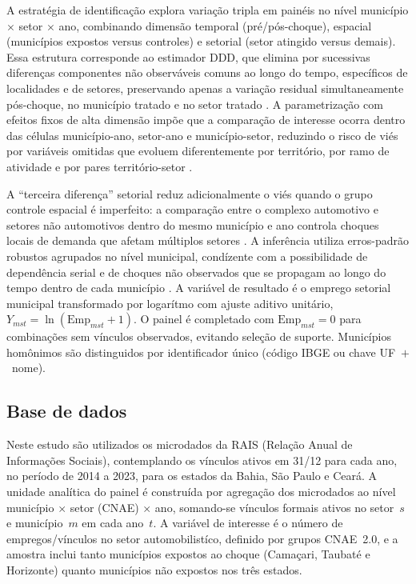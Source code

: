 \documentclass[12pt,a4paper]{article}
\begin{document}
A estrat\'egia de identifica\c{c}\~ao explora varia\c{c}\~ao tripla em pain\'eis no n\'ivel munic\'ipio $\times$ setor $\times$ ano, combinando dimens\~ao temporal (pr\'e/p\'os-choque), espacial (munic\'ipios expostos versus controles) e setorial (setor atingido versus demais). Essa estrutura corresponde ao estimador DDD, que elimina por sucessivas diferen\c{c}as componentes n\~ao observ\'aveis comuns ao longo do tempo, espec\'ificos de localidades e de setores, preservando apenas a varia\c{c}\~ao residual simultaneamente p\'os-choque, no munic\'ipio tratado e no setor tratado \parencite{olden2022}. A parametriza\c{c}\~ao com efeitos fixos de alta dimens\~ao imp\~oe que a compara\c{c}\~ao de interesse ocorra dentro das c\'elulas munic\'ipio-ano, setor-ano e munic\'ipio-setor, reduzindo o risco de vi\'es por vari\'aveis omitidas que evoluem diferentemente por territ\'orio, por ramo de atividade e por pares territ\'orio-setor \parencite{wooldridge2010}.

A ``terceira diferen\c{c}a'' setorial reduz adicionalmente o vi\'es quando o grupo controle espacial \'e imperfeito: a compara\c{c}\~ao entre o complexo automotivo e setores n\~ao automotivos dentro do mesmo munic\'ipio e ano controla choques locais de demanda que afetam m\'ultiplos setores \parencite{berck2016}. A infer\^encia utiliza erros-padr\~ao robustos agrupados no n\'ivel municipal, cond\'izente com a possibilidade de depend\^encia serial e de choques n\~ao observados que se propagam ao longo do tempo dentro de cada munic\'ipio \parencite{bertrand2004,cameron2015}. A vari\'avel de resultado \'e o emprego setorial municipal transformado por logar\'itmo com ajuste aditivo unit\'ario, $Y_{mst} = \ln(\text{Emp}_{mst}+1)$. O painel \'e completado com $\text{Emp}_{mst} = 0$ para combina\c{c}\~oes sem v\'inculos observados, evitando sele\c{c}\~ao de suporte. Munic\'ipios hom\^onimos s\~ao distinguidos por identificador \'unico (c\'odigo IBGE ou chave UF~$+$~nome).

\subsection{Base de dados}
\label{sub:dados}

Neste estudo s\~ao utilizados os microdados da RAIS (Rela\c{c}\~ao Anual de Informa\c{c}\~oes Sociais), contemplando os v\'inculos ativos em 31/12 para cada ano, no per\'iodo de 2014 a 2023, para os estados da Bahia, S\~ao Paulo e Cear\'a. A unidade anal\'itica do painel \'e constru\'ida por agrega\c{c}\~ao dos microdados ao n\'ivel munic\'ipio $\times$ setor (CNAE) $\times$ ano, somando-se v\'inculos formais ativos no setor~$s$ e munic\'ipio~$m$ em cada ano~$t$. A vari\'avel de interesse \'e o n\'umero de empregos/v\'inculos no setor automobilist\'ico, definido por grupos CNAE~2.0, e a amostra inclui tanto munic\'ipios expostos ao choque (Cama\c{c}ari, Taubat\'e e Horizonte) quanto munic\'ipios n\~ao expostos nos tr\^es estados.
\end{document}
